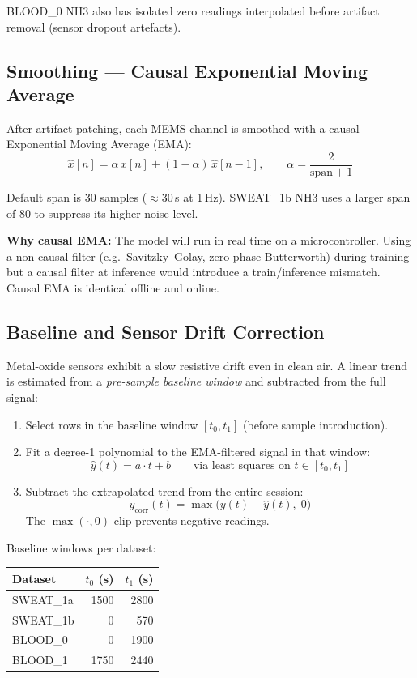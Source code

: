 \documentclass[11pt,a4paper]{article}
\begin{document}
BLOOD\_0 NH3 also has isolated zero readings interpolated before artifact
removal (sensor dropout artefacts).

\subsection{Smoothing --- Causal Exponential Moving Average}

After artifact patching, each MEMS channel is smoothed with a causal
Exponential Moving Average (EMA):
\[
  \hat{x}[n] = \alpha\, x[n] + (1 - \alpha)\, \hat{x}[n-1], \qquad
  \alpha = \frac{2}{\text{span} + 1}
\]

Default span is 30 samples ($\approx 30$\,s at 1\,Hz).  SWEAT\_1b NH3 uses
a larger span of 80 to suppress its higher noise level.

\textbf{Why causal EMA:} The model will run in real time on a microcontroller.
Using a non-causal filter (e.g.\ Savitzky--Golay, zero-phase Butterworth)
during training but a causal filter at inference would introduce a
train/inference mismatch.  Causal EMA is identical offline and online.

\subsection{Baseline and Sensor Drift Correction}

Metal-oxide sensors exhibit a slow resistive drift even in clean air.  A linear
trend is estimated from a \emph{pre-sample baseline window} and subtracted from
the full signal:

\begin{enumerate}
  \item Select rows in the baseline window $[t_0, t_1]$ (before sample
        introduction).
  \item Fit a degree-1 polynomial to the EMA-filtered signal in that window:
        \[
          \hat{y}(t) = a \cdot t + b
          \qquad \text{via least squares on } t \in [t_0, t_1]
        \]
  \item Subtract the extrapolated trend from the entire session:
        \[
          y_{\text{corr}}(t) = \max\!\bigl(y(t) - \hat{y}(t),\; 0\bigr)
        \]
        The $\max(\cdot, 0)$ clip prevents negative readings.
\end{enumerate}

Baseline windows per dataset:

\begin{center}
\begin{tabular}{lrr}
\toprule
Dataset & $t_0$ (s) & $t_1$ (s) \\
\midrule
SWEAT\_1a & 1500 & 2800 \\
SWEAT\_1b &    0 &  570 \\
BLOOD\_0  &    0 & 1900 \\
BLOOD\_1  & 1750 & 2440 \\
\bottomrule
\end{tabular}
\end{center}
\end{document}
